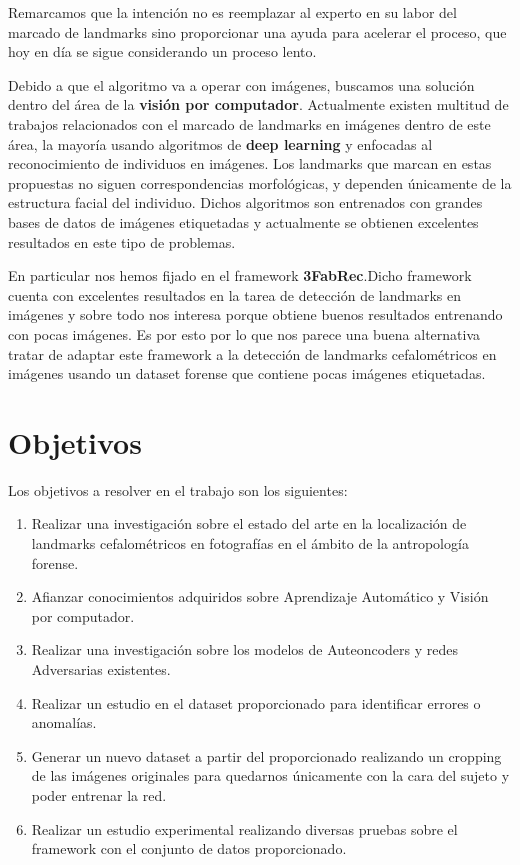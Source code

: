 \noindent Remarcamos que la intención no es reemplazar al experto en su labor del marcado de landmarks sino proporcionar una ayuda para acelerar el proceso, que hoy en día se sigue considerando un proceso lento.

\medskip 

\noindent Debido a que el algoritmo va a operar con imágenes, buscamos una solución dentro del área de la \textbf{visión por computador}. Actualmente existen  multitud de trabajos relacionados con el marcado de landmarks en imágenes dentro de este área, la mayoría usando algoritmos de \textbf{deep learning} y enfocadas al reconocimiento de individuos en imágenes. Los landmarks que marcan en estas propuestas no siguen correspondencias morfológicas, y dependen únicamente de la estructura facial del individuo. Dichos algoritmos son entrenados con grandes bases de datos de imágenes etiquetadas y actualmente se obtienen excelentes resultados en este tipo de problemas.

\medskip

\noindent En particular nos hemos fijado en el framework \textbf{3FabRec}\cite{browatzki20203fabrec}.Dicho framework cuenta con excelentes resultados en la tarea de detección de landmarks en imágenes y sobre todo nos interesa porque obtiene buenos resultados entrenando con pocas imágenes. Es por esto por lo que nos parece una buena alternativa tratar de adaptar este framework a la detección de landmarks cefalométricos en imágenes usando un dataset forense que contiene pocas imágenes etiquetadas.

\section{Objetivos}

\noindent Los objetivos a resolver en el trabajo son los siguientes: 

\begin{enumerate}
    \item Realizar una investigación sobre el estado del arte en la localización de landmarks cefalométricos en fotografías en el ámbito de la antropología forense.
    \item Afianzar conocimientos adquiridos sobre Aprendizaje Automático y Visión por computador.
    \item Realizar una investigación sobre los modelos de Auteoncoders y redes Adversarias existentes.
    \item Realizar un estudio en el dataset proporcionado para identificar errores o anomalías.
    \item Generar un nuevo dataset a partir del proporcionado realizando un cropping de las imágenes originales para quedarnos únicamente con la cara del sujeto y poder entrenar la red.
    \item Realizar un estudio experimental realizando diversas pruebas sobre el framework con el conjunto de datos proporcionado.
\end{enumerate}


\endinput


